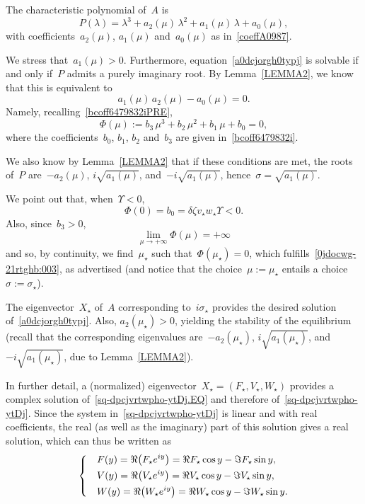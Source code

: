 \documentclass[12pt]{amsart}
\numberwithin{equation}{section}
\begin{document}
The characteristic polynomial of~$A$ is
$$ P(\lambda)=\lambda^3+ a_2(\mu)\,\lambda^2+a_1(\mu)\,\lambda+a_0(\mu),$$
with coefficients~$a_2(\mu)$, $a_1(\mu)$ and~$a_0(\mu)$ as in~\eqref{coeffA0987}.

We stress that~$a_1(\mu)>0$. Furthermore, equation~\eqref{a0dcjorgh0typj} is solvable if and only if~$P$
admits a purely imaginary root.
By Lemma~\ref{LEMMA2}, we know that this is equivalent to $$a_1(\mu)\, a_2(\mu)-a_0(\mu)=0.$$ Namely, recalling~\eqref{bcoff6479832iPRE},
\begin{equation}\label{0jdocwg-21rtghb:003}
\Phi(\mu):=b_3\,\mu^3+ b_2\,\mu^2 + b_1\,\mu +b_0=0,
\end{equation}
where the coefficients~$b_0$, $b_1$, $b_2$ and~$b_3$ are given in~\eqref{bcoff6479832i}.

We also know by Lemma~\ref{LEMMA2} that if these conditions are met,
the roots of~$P$ are~$-a_2(\mu)$, $i\sqrt{a_1(\mu)}$, and~$-i\sqrt{a_1(\mu)}$,
hence~$\sigma =\sqrt{a_1(\mu)}$.

We point out that, when~$\Upsilon<0$,
$$\Phi(0)=b_0=\delta\zeta v_\star w_\star\Upsilon<0.$$
Also, since~$b_3>0$,
$$\lim_{\mu\to+\infty}\Phi(\mu)=+\infty$$
and so, by continuity, we find~$\mu_\star$ such that~$\Phi(\mu_\star)=0$,
which fulfills~\eqref{0jdocwg-21rtghb:003}, as advertised
(and notice that the choice~$\mu:=\mu_\star$ entails a choice~$\sigma:=\sigma_\star$).

The eigenvector~$X_\star$ of~$A$ corresponding to~$i\sigma_\star$ provides the desired solution of~\eqref{a0dcjorgh0typj}.
Also, $a_2(\mu_\star)>0$, yielding the stability of the equilibrium (recall that
the corresponding eigenvalues are~$-a_2(\mu_\star)$, $i\sqrt{a_1(\mu_\star)}$, and~$-i\sqrt{a_1(\mu_\star)}$,
due to Lemma~\ref{LEMMA2}).

In further detail, a (normalized) eigenvector~$X_\star=(F_\star,V_\star,W_\star)$ provides a complex solution of~\eqref{sq-dpcjvrtwpho-ytDj.EQ}
and therefore of~\eqref{sq-dpcjvrtwpho-ytDj}. Since the system in~\eqref{sq-dpcjvrtwpho-ytDj} is linear and with
real coefficients, the real (as well as the imaginary) part of this solution gives a real solution, which can thus be written as
$$\begin{dcases}&F(y)=\Re\big(F_\star e^{iy}\big)=\Re F_\star \cos y-\Im F_\star\sin y,\\ &
V(y)=\Re\big(V_\star e^{iy}\big)=\Re V_\star \cos y-\Im V_\star\sin y,\\& W(y)=\Re\big(W_\star e^{iy}\big)=\Re W_\star \cos y-\Im W_\star\sin y.\end{dcases}$$
\end{document}
